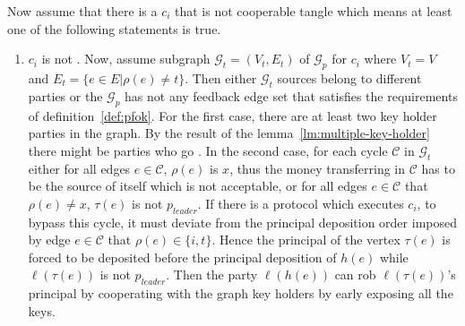 
Now assume that there is a $c_i$ that is not cooperable tangle which means at least one of the following statements is true.

\begin{enumerate}
    \item $c_i$ is not \keyoneOk. Now, assume subgraph $\mathcal{G}_{t}=(V_t, E_t)$ of $\mathcal{G}_{p}$ for $c_i$ where $V_t=V$ and $E_t=\{e \in E | \rho(e) \neq t\}$. Then either $\mathcal{G}_{t}$ sources belong to different parties or the $\mathcal{G}_{p}$ has not any feedback edge set that satisfies the requirements of definition~\ref{def:pfok}. For the first case, there are at least two \keyone key holder parties in the graph. By the result of the lemma~\ref{lm:multiple-key-holder} there might be parties who go \underwater. In the second case, for each cycle $\mathcal{C}$ in $\mathcal{G}_{t}$ either for all edges $e \in \mathcal{C}$, $\rho(e)$ is $x$, thus the money transferring in $\mathcal{C}$ has to be the source of itself which is not acceptable, or for all edges $e \in \mathcal{C}$ that $\rho(e) \neq x$, $\tau(e)$ is not $p_{leader}$. If there is a protocol which executes $c_i$, to bypass this cycle, it must deviate from the principal deposition order imposed by edge $e \in \mathcal{C}$ that $\rho(e) \in \{i, t\}$. Hence the principal of the vertex $\tau(e)$ is forced to be deposited before the principal deposition of $h(e)$ while $\ell(\tau(e))$ is not $p_{leader}$. Then the party $\ell(h(e))$ can rob $\ell(\tau(e))$'s principal by cooperating with the graph key holders by early exposing all the keys.
    

\end{enumerate}
